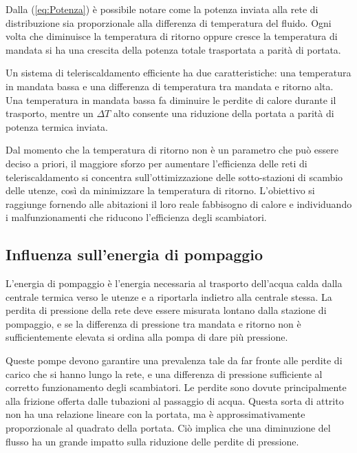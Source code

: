 \documentclass[laurea,oneside,11pt]{USiena_tesiLM}
\begin{document}
Dalla (\ref{eq:Potenza}) è possibile notare come la potenza inviata alla rete di distribuzione sia proporzionale alla differenza di temperatura del fluido. Ogni volta che diminuisce la temperatura di ritorno oppure cresce la temperatura di mandata si ha una crescita della potenza totale trasportata a parità di portata.

Un sistema di teleriscaldamento efficiente ha due caratteristiche: una temperatura in mandata bassa e una differenza di temperatura tra mandata e ritorno alta. Una temperatura in mandata bassa fa diminuire le perdite di calore durante il trasporto, mentre un $\Delta T$ alto consente una riduzione della portata a parità di potenza termica inviata.

Dal momento che la temperatura di ritorno non è un parametro che può essere deciso a priori, il maggiore sforzo per aumentare l'efficienza delle reti di teleriscaldamento si concentra sull'ottimizzazione delle sotto-stazioni di scambio delle utenze, così da minimizzare la temperatura di ritorno. L'obiettivo si raggiunge fornendo alle abitazioni il loro reale fabbisogno di calore e individuando i malfunzionamenti che riducono l'efficienza degli scambiatori. 
\subsection{Influenza sull'energia di pompaggio}
L'energia di pompaggio è l'energia necessaria al trasporto dell'acqua calda dalla centrale termica verso le utenze e a riportarla indietro alla centrale stessa. La perdita di pressione della rete deve essere misurata lontano dalla stazione di pompaggio, e se la differenza di pressione tra mandata e ritorno non è sufficientemente elevata si ordina alla pompa di dare più pressione.

Queste pompe devono garantire una prevalenza tale da far fronte alle perdite di carico che si hanno lungo la rete, e una differenza di pressione sufficiente al corretto funzionamento degli scambiatori. Le perdite sono dovute principalmente alla frizione offerta dalle tubazioni al passaggio di acqua. Questa sorta di attrito non ha una relazione lineare con la portata, ma è approssimativamente proporzionale al quadrato della portata. Ciò implica che una diminuzione del flusso ha un grande impatto sulla riduzione delle perdite di pressione.
\end{document}
